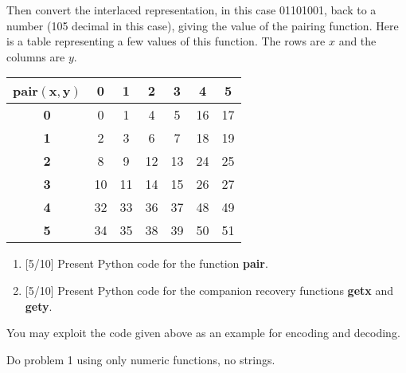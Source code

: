 \documentclass[12pt,letterpaper,boxed,cm]{hmcpset}
\newcommand{\tb}[1]{\textbf{#1}}
\newcommand{\mb}[1]{\mathbf{#1}}
\begin{document}
\begin{problem}[1.]
    Then convert the interlaced representation, in this case 01101001, back to a number (105 decimal in this case), giving the value of the pairing function. Here is a table representing a few values of this function. The rows are $x$ and the columns are $y$.
    \begin{center}
        \begin{tabular}{| c | c | c | c | c | c | c |}
            \hline
            \tb{pair}$\mb{(x,y)}$ & \tb{0} & \tb{1} & \tb{2} & \tb{3} & \tb{4} & \tb{5} \\
            \hline
            \tb{0} & 0 & 1 & 4 & 5 & 16 & 17 \\
            \hline
            \tb{1} & 2 & 3 & 6 & 7 & 18 & 19 \\
            \hline
            \tb{2} & 8 & 9 & 12 & 13 & 24 & 25 \\
            \hline
            \tb{3} & 10 & 11 & 14 & 15 & 26 & 27 \\
            \hline
            \tb{4} & 32 & 33 & 36 & 37 & 48 & 49 \\
            \hline
            \tb{5} & 34 & 35 & 38 & 39 & 50 & 51 \\
            \hline
        \end{tabular}
    \end{center}
    \begin{enumerate}[label=\alph*.]
        \item {[5/10]} Present Python code for the function \tb{pair}.
        \item {[5/10]} Present Python code for the companion recovery functions \tb{getx} and \tb{gety}.
    \end{enumerate}
    You may exploit the code given above as an example for encoding and decoding.
\end{problem}

\begin{solution}
    \vfill
\end{solution}
\newpage

\begin{problem} Do problem 1 using only numeric functions, no strings.
\end{problem}

\begin{solution}
    \vfill
\end{solution}
\newpage
\end{document}
